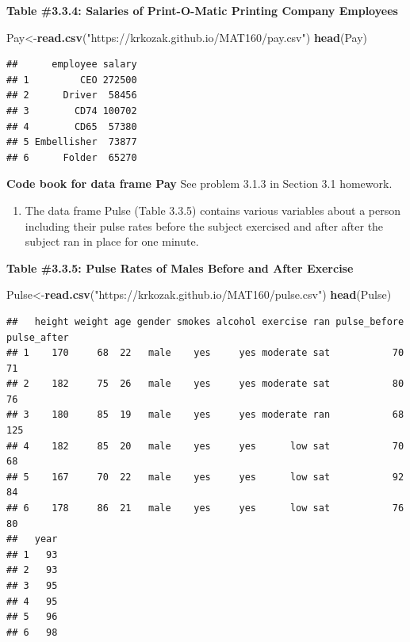 \documentclass[
]{book}
\newenvironment{Shaded}{\begin{snugshade}}{\end{snugshade}}
\newcommand{\KeywordTok}[1]{\textcolor[rgb]{0.13,0.29,0.53}{\textbf{#1}}}
\newcommand{\NormalTok}[1]{#1}
\newcommand{\StringTok}[1]{\textcolor[rgb]{0.31,0.60,0.02}{#1}}
\providecommand{\tightlist}{%
  \setlength{\itemsep}{0pt}\setlength{\parskip}{0pt}}
\begin{document}
\textbf{Table \#3.3.4: Salaries of Print-O-Matic Printing Company Employees}

\begin{Shaded}
\begin{Highlighting}[]
\NormalTok{Pay<-}\KeywordTok{read.csv}\NormalTok{(}\StringTok{"https://krkozak.github.io/MAT160/pay.csv"}\NormalTok{)}
\KeywordTok{head}\NormalTok{(Pay)}
\end{Highlighting}
\end{Shaded}

\begin{verbatim}
##      employee salary
## 1         CEO 272500
## 2      Driver  58456
## 3        CD74 100702
## 4        CD65  57380
## 5 Embellisher  73877
## 6      Folder  65270
\end{verbatim}

\textbf{Code book for data frame Pay} See problem 3.1.3 in Section 3.1 homework.

\begin{enumerate}
\def\labelenumi{\arabic{enumi}.}
\setcounter{enumi}{7}
\tightlist
\item
  The data frame Pulse (Table 3.3.5) contains various variables about a person including their pulse rates before the subject exercised and after after the subject ran in place for one minute.
\end{enumerate}

\textbf{Table \#3.3.5: Pulse Rates of Males Before and After Exercise}

\begin{Shaded}
\begin{Highlighting}[]
\NormalTok{Pulse<-}\KeywordTok{read.csv}\NormalTok{(}\StringTok{"https://krkozak.github.io/MAT160/pulse.csv"}\NormalTok{)}
\KeywordTok{head}\NormalTok{(Pulse)}
\end{Highlighting}
\end{Shaded}

\begin{verbatim}
##   height weight age gender smokes alcohol exercise ran pulse_before pulse_after
## 1    170     68  22   male    yes     yes moderate sat           70          71
## 2    182     75  26   male    yes     yes moderate sat           80          76
## 3    180     85  19   male    yes     yes moderate ran           68         125
## 4    182     85  20   male    yes     yes      low sat           70          68
## 5    167     70  22   male    yes     yes      low sat           92          84
## 6    178     86  21   male    yes     yes      low sat           76          80
##   year
## 1   93
## 2   93
## 3   95
## 4   95
## 5   96
## 6   98
\end{verbatim}
\end{document}
